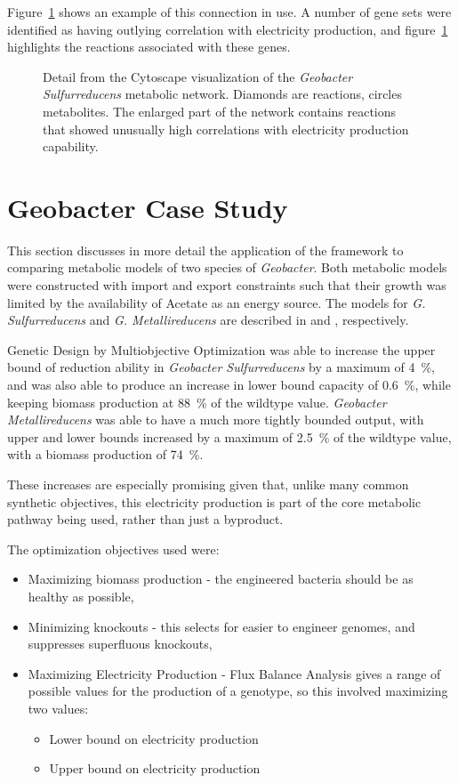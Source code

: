 \documentclass[a4paper]{article}
\begin{document}
Figure~\ref{fig:cytoscape-screenshot} shows an example of this connection in use. A number of gene sets were identified as having outlying correlation with electricity production, and figure~\ref{fig:cytoscape-screenshot} highlights the reactions associated with these genes. 

\begin{figure}[!htb]
\caption{Detail from the Cytoscape visualization of the {\it Geobacter Sulfurreducens} metabolic network. Diamonds are reactions, circles metabolites. The enlarged part of the network contains reactions that showed unusually high correlations with electricity production capability.}
\label{fig:cytoscape-screenshot}
\end{figure}

\section{Geobacter Case Study}
This section discusses in more detail the application of the framework to comparing metabolic models of two species of {\it Geobacter}. Both metabolic models were constructed with import and export constraints such that their growth was limited by the availability of Acetate as an energy source. The models for {\it G. Sulfurreducens} and {\it G. Metallireducens }are described in \cite{Mahadevan2006} and \cite{Sun2009}, respectively.

Genetic Design by Multiobjective Optimization was able to increase the upper bound of  reduction ability in {\it Geobacter Sulfurreducens} by a maximum of \SI{4}{\percent}, and was also able to produce an increase in lower bound capacity of  \SI{0.6}{\percent}, while keeping biomass production at  \SI{88}{\percent} of the wildtype value. 
{\it Geobacter Metallireducens} was able to have a much more tightly bounded output, with upper and lower bounds increased by a maximum of \SI{2.5}{\percent} of the wildtype value, with a biomass production of \SI{74}{\percent}.

These increases are especially promising given that, unlike many common synthetic objectives, this electricity production is part of the core metabolic pathway being used, rather than just a byproduct. 

The optimization objectives used were:
\begin{itemize}
	\item Maximizing biomass production - the engineered bacteria should be as healthy as possible,
	\item Minimizing knockouts - this selects for easier to engineer genomes, and suppresses superfluous knockouts,
	\item Maximizing Electricity Production - Flux Balance Analysis gives a range of possible values for the production of a genotype, so this involved maximizing two values:
	\begin{itemize}
		\item Lower bound on electricity production
		\item Upper bound on electricity production
	\end{itemize}
\end{itemize}
\end{document}
